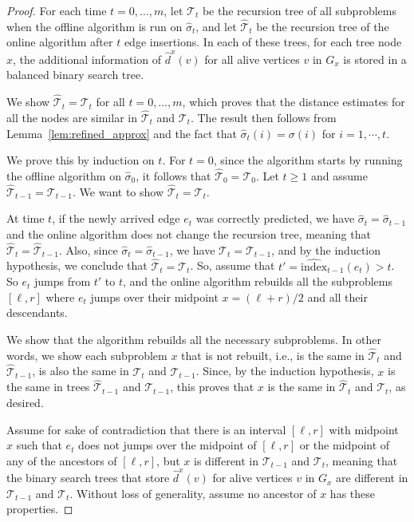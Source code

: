 \documentclass[11pt]{article}
\newcommand{\pred}{\hat{\sigma}}
\newcommand{\ind}{\text{index}}
\newcommand{\calT}{\mathcal{T}}
\begin{document}
\begin{proof}
    For each time $t=0,\ldots,m$, let $\mathcal{T}_t$ be the recursion tree of all subproblems when the offline algorithm is run on $\hat{\sigma}_t$, and let $\hat{\mathcal{T}}_t$ be the recursion tree of the online algorithm after $t$ edge insertions. 
    In each of these trees, for each tree node $x$, the additional information of $\hat{d}^x(v)$ for all alive vertices $v$ in $G_x$ is stored in a balanced binary search tree. 
    
    We show $\hat{\mathcal{T}}_t = \mathcal{T}_t$ for all $t=0,\ldots,m$, which proves that the distance estimates for all the nodes are similar in $\hat{\mathcal{T}}_t$ and $\mathcal{T}_t$. 
    The result then follows from Lemma~\ref{lem:refined_approx} and the fact that $\pred_t(i) = \sigma(i)$ for $i = 1, \cdots, t$.   

    We prove this by induction on $t$. 
    For $t=0$, since the algorithm starts by running the offline algorithm on $\hat{\sigma}_0$, it follows that $\hat{\mathcal{T}}_0 = \mathcal{T}_0$. 
    Let $t \geq 1$ and assume $\hat{\mathcal{T}}_{t-1} = \mathcal{T}_{t-1}$.
    We want to show $\hat{\mathcal{T}}_t = \mathcal{T}_t$.
    
    At time $t$, if the newly arrived edge $e_t$ was correctly predicted, we have $\hat{\sigma}_{t}=\hat{\sigma}_{t-1}$ and the online algorithm does not change the recursion tree, meaning that $\hat{\mathcal{T}}_t=\hat{\mathcal{T}}_{t-1}$.
    Also, since $\hat{\sigma}_{t}=\hat{\sigma}_{t-1}$, we have $\mathcal{T}_t=\mathcal{T}_{t-1}$, and by the induction hypothesis, we conclude that $\hat{\mathcal{T}}_t=\mathcal{T}_t$.
    So, assume that $t'=\widehat{\ind}_{t-1}(e_t)>t$. So $e_t$ jumps from $t'$ to $t$, and the online algorithm rebuilds all the subproblems $[\ell,r]$ where $e_t$ jumps over their midpoint $x=(\ell+r)/2$ and all their descendants.  

    We show that the algorithm rebuilds all the necessary subproblems.
    In other words, we show each subproblem $x$ that is not rebuilt, i.e., is the same in $\hat{\mathcal{T}}_{t}$ and $\hat{\mathcal{T}}_{t-1}$, is also the same in $\mathcal{T}_{t}$ and $\mathcal{T}_{t-1}$.
    Since, by the induction hypothesis, $x$ is the same in trees $\hat{\mathcal{T}}_{t-1}$ and $\mathcal{T}_{t-1}$, this proves that $x$ is the same in $\hat{\mathcal{T}}_{t}$ and $\mathcal{T}_{t}$, as desired.
    
    Assume for sake of contradiction that there is an interval $[\ell, r]$  with midpoint $x$ such that $e_t$ does not jumps over the midpoint of $[\ell, r]$ or the midpoint of any of the ancestors of $[\ell, r]$, but $x$ is different in $\calT_{t-1}$ and $\mathcal{T}_t$, meaning that the binary search trees that store $\hat{d}^x(v)$ for alive vertices $v$ in $G_x$ are different in $\calT_{t-1}$ and $\mathcal{T}_t$.
    Without loss of generality, assume no ancestor of $x$ has these properties. 
    

\end{proof}
\end{document}
